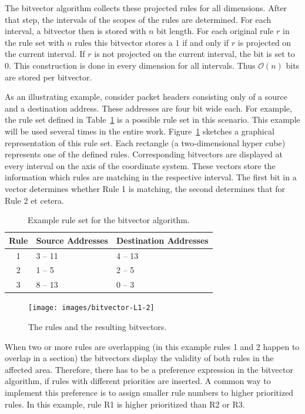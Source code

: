 \documentclass[a4paper,
		12pt,
		parskip=full,
		titlepage
		]{scrartcl}
\begin{document}
The bitvector algorithm collects these projected rules for all dimensions.
After that step, the intervals of the scopes of the rules are determined.
For each interval, a bitvector then is stored with $n$ bit length.
For each original rule $r$ in the rule set with $n$ rules this bitvector 
stores a $1$ if and only if $r$ is projected on the current interval.
If $r$ is not projected on the current interval, the bit is set to $0$.
This construction is done in every dimension for all intervals.
Thus $\mathcal O(n)$ bits are stored per bitvector.

As an illustrating example, consider packet headers consisting only of a source and a destination address.
These addresses are four bit wide each.
For example, the rule set defined in Table~\ref{table:bv_ruleset} is a possible rule set in this scenario.
This example will be used several times in the entire work.
Figure~\ref{fig:bv-normal} sketches a graphical representation of this rule set.
Each rectangle (a two-dimensional hyper cube) represents one of the defined rules.
Corresponding bitvectors are displayed at every interval on the axis of the coordinate system.
These vectors store the information which rules are matching in the respective interval.
The first bit in a vector determines whether Rule 1 is matching, the second determines that for Rule 2 et cetera.

\begin{table}
  \centering
  \begin{tabularx}{0.7\textwidth}{c|X|X}
  Rule&Source Addresses&Destination Addresses\\
  \hline
  1&3 -- 11&4 -- 13\\
  2&1 -- 5&2 -- 5\\
  3&8 -- 13&0 -- 3\\
  \end{tabularx}
  \caption{Example rule set for the bitvector algorithm.}
  \label{table:bv_ruleset}
\end{table}

\begin{figure}
\centering
\texttt{[image: images/bitvector-L1-2]}
\caption{The rules and the resulting bitvectors.}
\label{fig:bv-normal}
\end{figure}

When two or more rules are overlapping (in this example rules 1 and 2 happen 
to overlap in a section) the bitvectors display the validity of both rules in the affected area.
Therefore, there has to be a preference expression in the bitvector algorithm, 
if rules with different priorities are inserted.
A common way to implement this preference is to assign smaller rule numbers to higher prioritized rules.
In this example, rule R1 is higher prioritized than R2 or R3.
\end{document}
